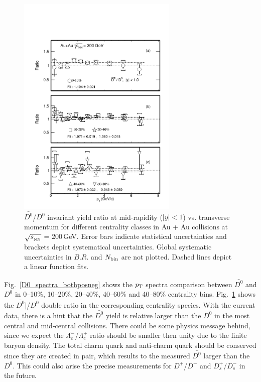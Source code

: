 \begin{figure}
\centering
\includegraphics[width=0.68\textwidth]{figure/Run14_D0HFT/D0_spectra_ratioposneg_fit.pdf}
\caption{$\bar{D^{0}}$/$D^{0}$ invariant yield ratio at mid-rapidity ($|y|<1$) vs. transverse momentum for different centrality classes in Au + Au collisions at $\sqrt{s_{_{\rm NN}}}$ = 200\,GeV. Error bars indicate statistical uncertainties and brackets depict systematical uncertainties. Global systematic uncertainties in $B.R.$ and $N_{\rm bin}$ are not plotted. Dashed lines depict a linear function fits.}
\label{D0_spectra_ratioposneg} 
\end{figure}

Fig.~\ref{D0_spectra_bothposneg} shows the $p_{\rm T}$ spectra comparison between $\bar{D^{0}}$ and $D^0$ in 0--10\%, 10--20\%, 20--40\%, 40--60\% and 40--80\% centrality bins. Fig.~\ref{D0_spectra_ratioposneg} shows the $\bar{D^{0}}|$/$D^{0}$ double ratio in the corresponding centrality species. With the current data, there is a hint that the $\bar{D^{0}}$ yield is relative larger than the $D^{0}$ in the most central and mid-central collisions. There could be some physics message behind, since we expect the $\bar{\Lambda_{c}^-}$/$\Lambda_{c}^+$ ratio should be smaller then unity due to the finite baryon density. The total charm quark and anti-charm quark should be conserved since they are created in pair, which results to the measured $\bar{D^0}$ larger than the $D^0$. This could also arise the precise measurements for $D^{+}$/$D^{-}$ and $D_{s}^{+}$/$D_{s}^{-}$ in the future.


